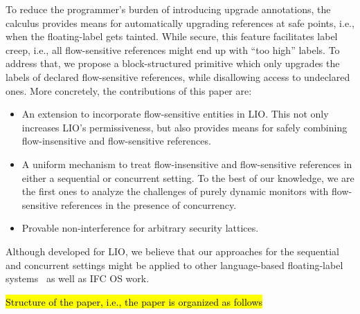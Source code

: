 To reduce the programmer's burden of
introducing upgrade annotations, the calculus provides means for automatically
upgrading references at safe points, i.e., when the floating-label gets tainted.
While secure, this feature facilitates label creep, i.e., all flow-sensitive
references might end up with ``too high'' labels. To address that, we propose a
block-structured primitive which only upgrades the labels of declared
flow-sensitive references, while disallowing access to undeclared ones.
More concretely, the contributions of this paper are:
\begin{itemize}

\item An extension to incorporate flow-sensitive entities in LIO. This
  not only increases LIO's permissiveness, but also provides means for safely
  combining flow-insensitive and flow-sensitive references.

\item A uniform mechanism to treat flow-insensitive and flow-sensitive
  references in either a sequential or concurrent setting. To the best of our
  knowledge, we are the first ones to analyze the challenges of purely dynamic
  monitors with flow-sensitive references in the presence of concurrency.

\item Provable non-interference for arbitrary security lattices.

\end{itemize}

Although developed for LIO, we believe that our approaches for the sequential
and concurrent settings might be applied to other language-based floating-label
systems~\citep[e.g.][]{10.1109/SP.2013.10} as well as IFC OS work.

\hl{Structure of the paper, i.e., the paper is organized as follows}
